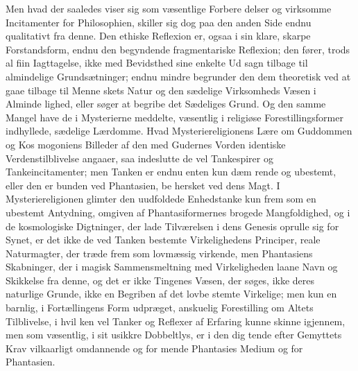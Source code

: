 \documentclass[12pt,a4paper]{book}
\begin{document}
Men hvad der saaledes viser sig som væsentlige Forbere\-%
delser og virksomme Incitamenter for Philosophien, skiller sig
dog paa den anden Side endnu qualitativt fra denne. Den
ethiske Reflexion er, ogsaa i sin klare, skarpe Forstandsform,
endnu den begyndende fragmentariske Reflexion; den fører,
trods al fiin Iagttagelse, ikke med Bevidsthed sine enkelte Ud\-%
sagn tilbage til almindelige Grundsætninger; endnu mindre
begrunder den dem theoretisk ved at gaae tilbage til Menne\-%
skets Natur og den sædelige Virksomheds Væsen i Alminde\-%
lighed, eller søger at begribe det Sædeliges Grund. Og den
samme Mangel have de i Mysterierne meddelte, væsentlig i
religiøse Forestillingsformer indhyllede, sædelige Lærdomme.
Hvad Mysteriereligionens Lære om Guddommen og Kos\-%
mogoniens Billeder af den med Gudernes Vorden identiske
Verdenstilblivelse angaaer, saa indeslutte de vel Tankespirer og
Tankeincitamenter; men Tanken er endnu enten kun dæm\-%
rende og ubestemt, eller den er bunden ved Phantasien, be\-%
hersket ved dens Magt. I Mysteriereligionen glimter den
uudfoldede Enhedstanke kun frem som en ubestemt Antydning,
omgiven af Phantasiformernes brogede Mangfoldighed, og i de
kosmologiske Digtninger, der lade Tilværelsen i dens Genesis
oprulle sig for Synet, er det ikke de ved Tanken bestemte
Virkelighedens Principer, reale Naturmagter, der træde frem
som lovmæssig virkende, men Phantasiens Skabninger, der i
magisk Sammensmeltning med Virkeligheden laane Navn og
Skikkelse fra denne, og det er ikke Tingenes Væsen, der søges,
ikke deres naturlige Grunde, ikke en Begriben af det lovbe\-%
stemte Virkelige; men kun en barnlig, i Fortællingens Form
udpræget, anskuelig Forestilling om Altets Tilblivelse, i hvil\-%
ken vel Tanker og Reflexer af Erfaring kunne skinne igjennem,
men som væsentlig, i sit usikkre Dobbeltlys, er i den dig\-%
tende efter Gemyttets Krav vilkaarligt omdannende og for\-%
mende Phantasies Medium og for Phantasien.
\end{document}
